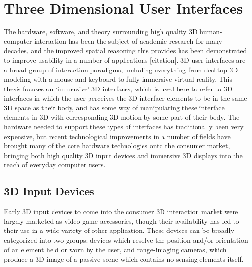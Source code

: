 \section{Three Dimensional User Interfaces}

The hardware, software, and theory surrounding high quality 3D human-computer interaction has been the subject of academic research for many decades, and the improved spatial reasoning this provides has been demonstrated to improve usability in a  number of applications  [citation]. 3D user interfaces are a broad group of interaction paradigms, including everything from desktop 3D modeling with a mouse and keyboard to fully immersive virtual reality.  This thesis focuses on ‘immersive’ 3D interfaces, which is used here to refer to 3D interfaces in which the user perceives the 3D interface elements to be in the same 3D space as their body, and has some way of manipulating these interface elements in 3D with corresponding 3D motion by some part of their body.  The hardware needed to support these types of interfaces has traditionally been very expensive, but recent technological improvements in a number of fields have brought many of the core hardware technologies onto the consumer market, bringing both high quality 3D input devices and immersive 3D displays into the reach of everyday computer users.

\subsection{3D Input Devices}

Early 3D input devices to come into the consumer 3D interaction market were largely marketed as video game accessories, though their availability has led to their use in a wide variety of other application. These devices can be broadly categorized into two groups: devices which resolve the position and/or orientation of an element held or worn by the user, and range-imaging cameras, which produce a 3D image of a passive scene which contains no sensing elements itself.

